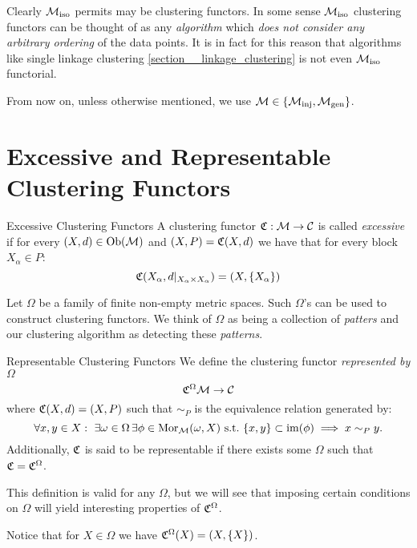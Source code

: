 Clearly ${\mathcal{M}_\mathrm{iso}}$ permits may be clustering functors.
In some sense ${\mathcal{M}_\mathrm{iso}}$ clustering functors can be thought of as any \emph{algorithm} which \emph{does not consider any arbitrary ordering} of the data points.
It is in fact for this reason that algorithms like single linkage clustering \ref{section__linkage_clustering} is not even ${\mathcal{M}_\mathrm{iso}}$ functorial.

From now on, unless otherwise mentioned, we use $\mathcal{M} \in \{{\mathcal{M}_\mathrm{inj}}, {\mathcal{M}_\mathrm{gen}}\}$.

\section{Excessive and Representable Clustering Functors}
\begin{definition}{Excessive Clustering Functors}{}
A clustering functor $\mathfrak{C}: \mathcal{M} \to \mathcal{C}$ is called \emph{excessive} if for every $(X,d) \in \mathrm {Ob}(\mathcal{M})$ and $(X,P) = \mathfrak{C}(X,d)$ we have that for every block $X_\alpha \in P$:
$$
\mathfrak{C}(X_\alpha, d|_{X_\alpha \times X_\alpha}) = (X, \{X_\alpha\})
$$
\end{definition}

Let $\Omega$ be a family of finite non-empty metric spaces. Such $\Omega$'s can be used to construct clustering functors. We think of $\Omega$ as being a collection of \emph{patters} and our clustering algorithm as detecting these \emph{patterns}.



\begin{definition}{Representable Clustering Functors}{}
We define the clustering functor \emph{represented by $\Omega$}
$$
\mathfrak{C}^\Omega \mathcal{M} \to \mathcal{C}
$$
where $\mathfrak{C}(X,d) = (X, P)$ such that $\sim_P$ 
is the equivalence relation generated by:
\begin{equation*}
    \forall x,y \in X: \ \exists \omega \in \Omega \,\exists \phi \in \mathrm {Mor}_{\mathcal{M}}(\omega, X) \ \text{s.t.} \ \{x,y\} \subset \operatorname*{im}(\phi) \implies x \sim_P y.
\end{equation*}
Additionally, $\mathfrak{C}$ is said to be representable if there exists some $\Omega$ such that $\mathfrak{C} = \mathfrak{C}^\Omega$.
\end{definition}

This definition is valid for any $\Omega$, but we will see that imposing certain conditions on $\Omega$ will yield interesting properties of $\mathfrak{C}^\Omega$.

\begin{myremark}{}{}
Notice that for $X \in \Omega$ we have $\mathfrak{C}^\Omega(X) = (X, \{X\})$.
\end{myremark}

